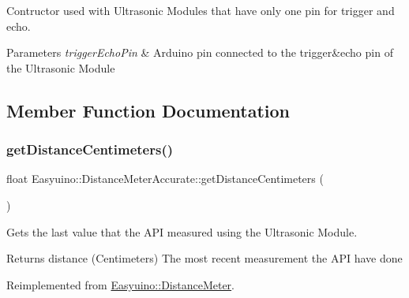 Contructor used with Ultrasonic Modules that have only one pin for trigger and echo. 


\begin{DoxyParams}{Parameters}
{\em trigger\+Echo\+Pin} & Arduino pin connected to the trigger\&echo pin of the Ultrasonic Module \\
\hline
\end{DoxyParams}


\subsection{Member Function Documentation}
\mbox{\label{class_easyuino_1_1_distance_meter_accurate_a4de44a347db0bebbf5d74f12397cd4d9}} 
\subsubsection{\texorpdfstring{get\+Distance\+Centimeters()}{getDistanceCentimeters()}}
{\footnotesize\ttfamily float Easyuino\+::\+Distance\+Meter\+Accurate\+::get\+Distance\+Centimeters (\begin{DoxyParamCaption}{ }\end{DoxyParamCaption})\hspace{0.3cm}{\ttfamily [virtual]}}



Gets the last value that the A\+PI measured using the Ultrasonic Module. 

\begin{DoxyReturn}{Returns}
distance (Centimeters) The most recent measurement the A\+PI have done 
\end{DoxyReturn}


Reimplemented from \hyperlink{class_easyuino_1_1_distance_meter_a637cdd0d3e4f3bcf094704ae91e0c7c3}{Easyuino\+::\+Distance\+Meter}.

\mbox{\label{class_easyuino_1_1_distance_meter_accurate_af7c43ebaa1ae75db2f806dc7039c8a82}} 
